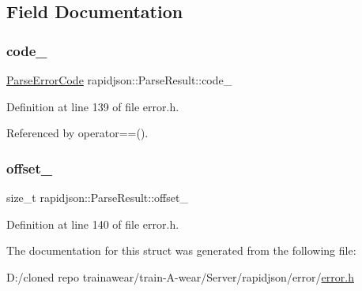\subsection{Field Documentation}
\mbox{\label{structrapidjson_1_1_parse_result_aa8a4a0331c0b50ce9f28be8449cb91e1}} 
\subsubsection{\texorpdfstring{code\_}{code\_}}
{\footnotesize\ttfamily \mbox{\hyperlink{group___r_a_p_i_d_j_s_o_n___e_r_r_o_r_s_ga7d3acf640886b1f2552dc8c4cd6dea60}{Parse\+Error\+Code}} rapidjson\+::\+Parse\+Result\+::code\+\_\+\hspace{0.3cm}{\ttfamily [private]}}



Definition at line 139 of file error.\+h.



Referenced by operator==().

\mbox{\label{structrapidjson_1_1_parse_result_a5af9e6aa0412019ac0820dcd2eac8c10}} 
\subsubsection{\texorpdfstring{offset\_}{offset\_}}
{\footnotesize\ttfamily size\+\_\+t rapidjson\+::\+Parse\+Result\+::offset\+\_\+\hspace{0.3cm}{\ttfamily [private]}}



Definition at line 140 of file error.\+h.



The documentation for this struct was generated from the following file\+:\begin{DoxyCompactItemize}
\item 
D\+:/cloned repo trainawear/train-\/\+A-\/wear/\+Server/rapidjson/error/\mbox{\hyperlink{error_8h}{error.\+h}}\end{DoxyCompactItemize}
